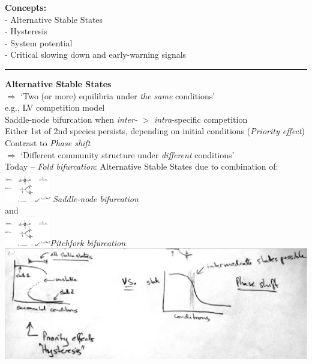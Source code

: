 \documentclass{article}
\newcommand{\ind}{\-\hspace{1cm}}
\begin{document}
\noindent{}

\textbf{Concepts:}\\
\ind - Alternative Stable States\\
\ind - Hysteresis\\
\ind - System potential\\
\ind - Critical slowing down and early-warning signals

\rule[0.5ex]{\linewidth}{1pt}
\textbf{Alternative Stable States}\\
 $\Rightarrow$ `Two (or more) equilibria under \emph{the same} conditions'\\
e.g., LV competition model\\
\ind Saddle-node bifurcation when \emph{inter-} $>$ \emph{intra}-specific competition\\
\ind \ind Either 1st of 2nd species persists, depending on initial conditions (\emph{Priority effect})\\

Contrast to \emph{Phase shift}\\
 $\Rightarrow$ `Different community structure under \emph{different} conditions'\\
 
Today -- \emph{Fold bifurcation}:  Alternative Stable States due to combination of:\\
\ind \includegraphics[width=2cm]{figs/SaddleNode.pdf} \ind  \emph{Saddle-node bifurcation}\\
\ind and\\
\ind  \includegraphics[width=2cm]{figs/Pitchfork.pdf}\ind \emph{Pitchfork bifurcation}\\

\includegraphics[width=16cm]{figs/Fold_vs_Phase.pdf}
\end{document}
